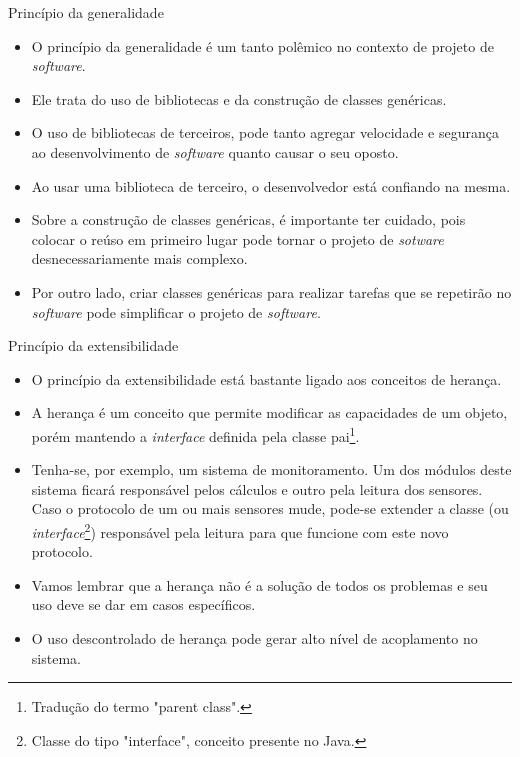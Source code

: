 \documentclass[11pt,justified]{beamer}
\begin{document}
\begin{frame}{Princípio da generalidade}
    \begin{itemize}
        \item O princípio da generalidade é um tanto polêmico no contexto de projeto de \textit{software}.
        \item Ele trata do uso de bibliotecas e da construção de classes genéricas.
        \item O uso de bibliotecas de terceiros, pode tanto agregar velocidade e segurança ao desenvolvimento de \textit{software} quanto causar o seu oposto.
        \item Ao usar uma biblioteca de terceiro, o desenvolvedor está confiando na mesma.
        \item Sobre a construção de classes genéricas, é importante ter cuidado, pois colocar o reúso em primeiro lugar pode tornar o projeto de \textit{sotware} desnecessariamente mais complexo.
        \item Por outro lado, criar classes genéricas para realizar tarefas que se repetirão no \textit{software} pode simplificar o projeto de \textit{software}.
    \end{itemize}
\end{frame}

\begin{frame}{Princípio da extensibilidade}
    \begin{itemize}
        \item O princípio da extensibilidade está bastante ligado aos conceitos de herança.
        \item A herança é um conceito que permite modificar as capacidades de um objeto, porém mantendo a \textit{interface} definida pela classe pai\footnote{Tradução do termo "parent class".}.
        \item Tenha-se, por exemplo, um sistema de monitoramento. Um dos módulos deste sistema ficará responsável pelos cálculos e outro pela leitura dos sensores. Caso o protocolo de um ou mais sensores mude, pode-se extender a classe (ou \textit{interface}\footnote{Classe do tipo "interface", conceito presente no Java.}) responsável pela leitura para que funcione com este novo protocolo.
        \item Vamos lembrar que a herança não é a solução de todos os problemas e seu uso deve se dar em casos específicos.
        \item O uso descontrolado de herança pode gerar alto nível de acoplamento no sistema.
    \end{itemize}
\end{frame}
\end{document}
